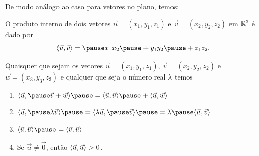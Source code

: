 \documentclass{beamer}
\begin{document}
\begin{frame}
    De modo análogo ao caso para vetores no plano, \pause temos:\pause
    \begin{teorema}
        O produto interno de dois vetores \pause $\vec{u} = (x_1, y_1,z_1)$ \pause e $\vec{v} = (x_2, y_2,z_2)$ \pause em $\mathbb{R}^3$ \pause é dado por\pause
        \[
            \inner{u}{v} = \pause x_1x_2 \pause + y_1y_2 \pause + z_1z_2.
        \]
    \end{teorema}
\end{frame}

\begin{frame}
    \begin{proposicao}\label{propriedades-produto-vetorial-espaco}
        Quaisquer que sejam os vetores \pause $\vec{u} = (x_1, y_1,z_1)$, \pause $\vec{v} = (x_2, y_2,z_2)$ \pause e $\vec{w} = (x_3, y_3,z_3)$ \pause e qualquer que seja o número real $\lambda$ \pause temos\pause
        \begin{enumerate}[label=({\roman*})]
            \item\label{linearidade-soma-produto-vetorial-espaco} $\langle\vec{u}, \pause \vec{v} + \vec{w}\rangle \pause = \inner{u}{v} \pause + \inner{u}{w}$\pause
            \item\label{linearidade-escalar-produto-vetorial-espaco} $\langle\vec{u}, \pause \lambda\vec{v}\rangle \pause = \langle\lambda\vec{u}, \pause \vec{v}\rangle \pause = \lambda \pause \inner{u}{v}$\pause
            \item $\inner{u}{v} \pause = \inner{v}{u}$\pause
            \item Se $\vec{u} \ne \vec{0}$, \pause então $\langle \vec{u}, \vec{u} \rangle > 0$.
        \end{enumerate}
    \end{proposicao}
\end{frame}
\end{document}

